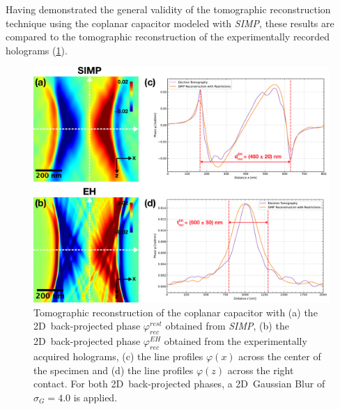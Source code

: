 Having demonstrated the general validity of the tomographic reconstruction technique using the coplanar capacitor modeled with \emph{SIMP}, these results are compared to the tomographic reconstruction of the experimentally recorded holograms (\cref{fig:capacitor-SIMP-EH-tomography-comparison}).
\begin{figure}[H]
	\centering
	\includegraphics[width=\textwidth]{Figures/Results/Capacitor/Tomography/capacitor-SIMP-EH-tomography-comparison.pdf}
	\caption{Tomographic reconstruction of the coplanar capacitor with (a) the 2D~back-projected phase $\varphi_{\mathit{rec}}^{\mathit{rest}}$ obtained from \emph{SIMP}, (b) the 2D~back-projected phase $\varphi_{\mathit{rec}}^{\mathit{EH}}$ obtained from the experimentally acquired holograms, (c) the line profiles $\varphi\left(x\right)$ across the center of the specimen and (d) the line profiles $\varphi\left(z\right)$ across the right contact. For both 2D~back-projected phases, a 2D~Gaussian Blur of $\sigma_G = 4.0$ is applied.}
	\label{fig:capacitor-SIMP-EH-tomography-comparison}
\end{figure}
